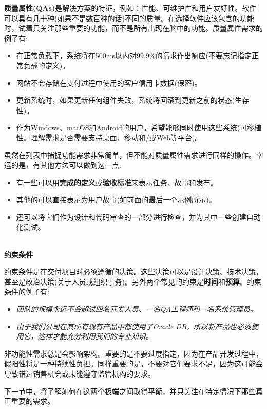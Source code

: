 \textbf{质量属性(QAs)}是解决方案的特征，例如：性能、可维护性和用户友好性。软件可以具有几十种(如果不是数百种的话)不同的质量。在选择软件应该包含的功能时，试着只关注那些重要的功能，而不是所有出现在脑中的功能。质量属性需求的例子有:

\begin{itemize}
\item 
在正常负载下，系统将在500ms以内对99.9\%的请求作出响应(不要忘记指定正常负载的定义)。

\item 
网站不会存储在支付过程中使用的客户信用卡数据(保密)。

\item
更新系统时，如果更新任何组件失败，系统将回滚到更新之前的状态(生存性)。

\item 
作为Windows、macOS和Android的用户，希望能够同时使用这些系统(可移植性。理解需求是否需要支持桌面、移动和/或Web等平台)。
\end{itemize}

虽然在列表中捕捉功能需求非常简单，但不能对质量属性需求进行同样的操作。幸运的是，有其他方法可以做到这一点:

\begin{itemize}
\item 
有一些可以用\textbf{完成的定义}或\textbf{验收标准}来表示任务、故事和发布。

\item 
其他的可以直接表示为用户故事(如前面的最后一个示例所示)。

\item 
还可以将它们作为设计和代码审查的一部分进行检查，并为其中一些创建自动化测试。
\end{itemize}

\hspace*{\fill} \\ %
\noindent
\textbf{约束条件}

约束条件是在交付项目时必须遵循的决策。这些决策可以是设计决策、技术决策，甚至是政治决策(关于人员或组织事务)。另外两个常见的约束是\textbf{时间}和\textbf{预算}。约束条件的例子有:

\begin{itemize}
\item 
\textit{团队的规模永远不会超过四名开发人员、一名QA工程师和一名系统管理员。}

\item 
\textit{由于我们公司在其所有现有产品中都使用了Oracle DB，所以新产品也必须使用它，这样才能充分利用我们的专业知识。}
\end{itemize}

非功能性需求总是会影响架构。重要的是不要过度指定，因为在产品开发过程中，假阳性将是一种持续性负担。同样重要的是，不要对它们要求不足，因为这可能会导致错过销售机会或未能遵守监管机构的要求。

下一节中，将了解如何在这两个极端之间取得平衡，并只关注在特定情况下那些真正重要的需求。






